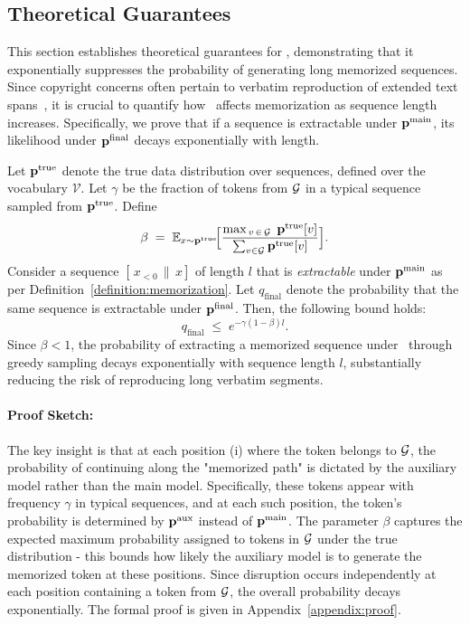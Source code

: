 \subsection{Theoretical Guarantees}
\label{subsec:theory}
This section establishes theoretical guarantees for \sys, demonstrating that it exponentially suppresses the probability of generating long memorized sequences. Since copyright concerns often pertain to verbatim reproduction of extended text spans~\citep{karamolegkou2023copyright}, it is crucial to quantify how \sys\ affects memorization as sequence length increases. Specifically, we prove that if a sequence is extractable under \(\mathbf{p}^{\text{main}}\), its likelihood under \(\mathbf{p}^{\text{final}}\) decays exponentially with length.

\begin{theorem}
\label{theorem:swap}
Let \(\mathbf{p}^{\text{true}}\) denote the true data distribution over sequences, defined over the vocabulary \(\mathcal{V}\). Let \(\gamma\) be the fraction of tokens from \(\mathcal{G}\) in a typical sequence sampled from \(\mathbf{p}^{\text{true}}\). Define
\[
\beta 
\;=\;
\mathbb{E}_{x \sim \mathbf{p}^{\text{true}}}\!\Bigl[\frac{\max_{\,v \,\in\, \mathcal{G}}\; \mathbf{p}^{\text{true}}[v]}{\sum_{v \in \mathcal{G}} \mathbf{p}^{\text{true}}[v]}\Bigr].
\]
Consider a sequence \([\,x_{<0} \,\|\, x]\) of length \(l\) that is \emph{extractable} under \(\mathbf{p}^{\text{main}}\) as per Definition~\ref{definition:memorization}. Let \(q_{\text{final}}\) denote the probability that the same sequence is extractable under \(\mathbf{p}^{\text{final}}\). Then, the following bound holds:
\[
q_{\text{final}}
\;\leq\;
e^{-\gamma(1-\beta)l}.
\]
Since \(\beta < 1\), the probability of extracting a memorized sequence under \sys\ through greedy sampling decays exponentially with sequence length \(l\), substantially reducing the risk of reproducing long verbatim segments.
\end{theorem}
\paragraph{Proof Sketch: }The key insight is that at each position (i) where the token belongs to \(\mathcal{G}\), the probability of continuing along the "memorized path" is dictated by the auxiliary model rather than the main model. Specifically, these tokens appear with frequency \(\gamma\) in typical sequences, and at each such position, the token's probability is determined by \(\mathbf{p}^{\text{aux}}\) instead of \(\mathbf{p}^{\text{main}}\). The parameter \(\beta\) captures the expected maximum probability assigned to tokens in \(\mathcal{G}\) under the true distribution - this bounds how likely the auxiliary model is to generate the memorized token at these positions. Since disruption occurs independently at each position containing a token from \(\mathcal{G}\), the overall probability decays exponentially. The formal proof is given in Appendix~\ref{appendix:proof}. 

